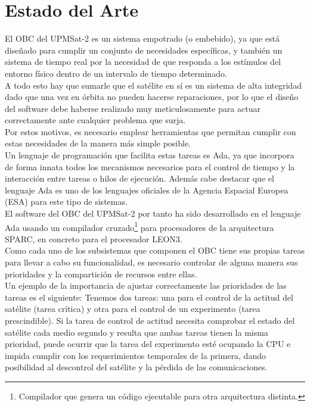 
\chapter{Estado del Arte}
\label{chap:estado_del_arte}

El OBC del UPMSat-2 es un sistema empotrado (o embebido), ya que está
diseñado para cumplir un conjunto de necesidades específicas, y 
también un sistema de tiempo real por la necesidad de que responda a los
estímulos del entorno físico dentro de un intervalo de tiempo determinado.\\

A todo esto hay que sumarle que el satélite en sí es un sistema de alta
integridad dado que una vez en órbita no pueden hacerse reparaciones,
por lo que el diseño del software debe haberse realizado muy
meticulosamente para actuar correctamente ante cualquier problema que surja.\\

Por estos motivos, es necesario emplear herramientas que permitan cumplir
con estas necesidades de la manera más simple posible.\\


Un lenguaje de programación que facilita estas tareas es Ada, ya que incorpora
de forma innata todos los mecanismos necesarios para el control de tiempo y la
interacción entre tareas o hilos de ejecución.
Además cabe destacar que el lenguaje Ada es
uno de los lenguajes oficiales de la Agencia Espacial Europea
(ESA\cite{web-ESA}) para este tipo de sistemas.\\

El software del OBC del UPMSat-2 por tanto ha sido desarrollado en el lenguaje
Ada usando un compilador cruzado\footnote{Compilador que genera un código
  ejecutable para otra arquitectura distinta.}
para procesadores de la arquitectura SPARC, en concreto para el procesador
LEON3.\\

Como cada uno de los subsistemas que componen el OBC tiene sus propias
tareas para llevar a cabo su funcionalidad, es necesario
controlar de alguna manera sus prioridades y la compartición de recursos entre
ellas.\\

Un ejemplo de la importancia de ajustar correctamente las prioridades de las
tareas es el siguiente:
Tenemos dos tareas: una para el control de la actitud del satélite (tarea
crítica) y otra para
el control de un experimento (tarea prescindible). Si la tarea de control de
actitud necesita
comprobar el estado del satélite cada medio segundo y resulta que ambas tareas
tienen la misma prioridad, puede ocurrir que la tarea del experimento esté
ocupando la CPU e impida cumplir con los requerimientos temporales de la
primera, dando posibilidad al descontrol del satélite y la pérdida de las
comunicaciones.\\

